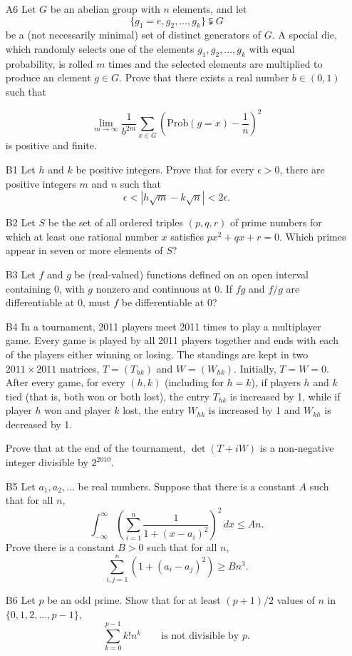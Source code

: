 \documentclass[amssymb,twocolumn,pra,10pt,aps]{revtex4-1}
\begin{document}
\begin{itemize}
\item[A6] Let $G$ be an abelian group with $n$ elements, and let
\[ \{g_1=e,g_2,\dots,g_k\} \subsetneqq G \]
be a (not necessarily minimal) set of distinct generators of $G$. A special
die, which randomly selects one of the elements $g_1,g_2,...,g_k$ with equal
probability, is rolled $m$ times and the selected elements are multiplied
to produce an element $g \in G$.  Prove that there exists a real number
$b \in (0,1)$ such that

\[ \lim_{m\to\infty} \frac{1}{b^{2m}} \sum_{x\in G} \left(\mathrm{Prob}(g=x)
    - \frac{1}{n}\right)^2 \]
is positive and finite.

\item[B1] Let $h$ and $k$ be positive integers. Prove that for every
$\epsilon > 0$, there are positive integers $m$ and $n$ such that
\[ \epsilon < |h \sqrt{m} - k \sqrt{n}| < 2\epsilon.  \]

\item[B2] Let $S$ be the set of all ordered triples $(p,q,r)$ of prime
numbers for which at least one rational number $x$ satisfies $px^2 + qx +
r =0$. Which primes appear in seven or more elements of $S$?

\item[B3] Let $f$ and $g$ be (real-valued) functions defined on an open
interval containing $0$, with $g$ nonzero and continuous at $0$.  If $fg$
and $f/g$ are differentiable at $0$, must $f$ be differentiable at 0?

\item[B4] In a tournament, 2011 players meet 2011 times to play a
multiplayer game. Every game is played by all 2011 players together and
ends with each of the players either winning or losing. The standings
are kept in two $2011 \times 2011$ matrices, $T = (T_{hk})$ and $W =
(W_{hk})$. Initially, $T=W=0$. After every game, for every $(h,k)$ (including
for $h=k$), if players $h$ and $k$ tied (that is, both won or both lost),
the entry $T_{hk}$ is increased by 1, while if player $h$ won and player $k$
lost, the entry $W_{hk}$ is increased by 1 and $W_{kh}$ is decreased by 1.

Prove that at the end of the tournament, $\det(T+iW)$ is a non-negative
integer divisible by $2^{2010}$.

\item[B5] Let $a_1, a_2, \dots$ be real numbers. Suppose that there is
a constant $A$ such that for all $n$,
\[
\int_{-\infty}^\infty \left( \sum_{i=1}^n \frac{1}{1 + (x-a_i)^2} \right)^2\,dx \leq An.
\]
Prove there is a constant $B>0$ such that for all $n$,
\[
\sum_{i,j=1}^n (1 + (a_i - a_j)^2) \geq Bn^3.
\]

\item[B6]
Let $p$ be an odd prime. Show that for at least $(p+1)/2$ values of $n$ in $\{0,1,2,\dots,p-1\}$,
\[
\sum_{k=0}^{p-1} k! n^k \qquad \mbox{is not divisible by $p$.}
\]

\end{itemize}
\end{document}
